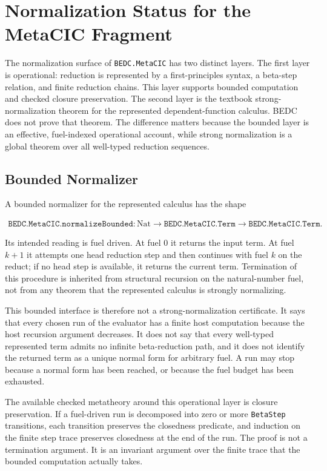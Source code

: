 \section{Normalization Status for the MetaCIC Fragment}
\label{sec:self-comp-metacic-normalization}

The normalization surface of \texttt{BEDC.MetaCIC} has two distinct layers.
The first layer is operational: reduction is represented by a first-principles
syntax, a beta-step relation, and finite reduction chains. This layer supports
bounded computation and checked closure preservation. The second layer is the
textbook strong-normalization theorem for the represented dependent-function
calculus. BEDC does not prove that theorem. The difference matters because the
bounded layer is an effective, fuel-indexed operational account, while strong
normalization is a global theorem over all well-typed reduction sequences.

\subsection{Bounded Normalizer}
\label{subsec:metacic-bounded-normalizer}

A bounded normalizer for the represented calculus has the shape

$$
\begin{aligned}
  \texttt{BEDC.MetaCIC.normalizeBounded} :
  \mathrm{Nat} \to \texttt{BEDC.MetaCIC.Term} \to
  \texttt{BEDC.MetaCIC.Term}.
\end{aligned}
$$

Its intended reading is fuel driven. At fuel $0$ it returns the input term.
At fuel $k+1$ it attempts one head reduction step and then continues with
fuel $k$ on the reduct; if no head step is available, it returns the current
term. Termination of this procedure is inherited from structural recursion on
the natural-number fuel, not from any theorem that the represented calculus is
strongly normalizing.

This bounded interface is therefore not a strong-normalization certificate.
It says that every chosen run of the evaluator has a finite host computation
because the host recursion argument decreases. It does not say that every
well-typed represented term admits no infinite beta-reduction path, and it
does not identify the returned term as a unique normal form for arbitrary
fuel. A run may stop because a normal form has been reached, or because the
fuel budget has been exhausted.

The available checked metatheory around this operational layer is closure
preservation. If a fuel-driven run is decomposed into zero or more
\texttt{BetaStep} transitions, each transition preserves the closedness
predicate, and induction on the finite step trace preserves closedness at the
end of the run. The proof is not a termination argument. It is an invariant
argument over the finite trace that the bounded computation actually takes.

